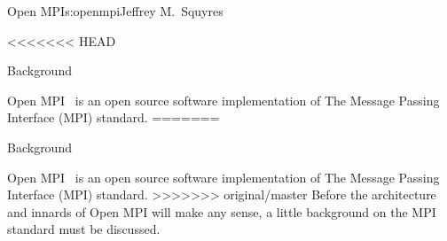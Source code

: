 \begin{aosachapter}{Open MPI}{s:openmpi}{Jeffrey M.\ Squyres}

<<<<<<< HEAD




\begin{aosasect1}{Background}


Open MPI~\cite{gabriel04:_open_mpi} is an open source software
implementation of The Message Passing Interface (MPI) standard.
%
=======
\begin{aosasect1}{Background}

Open MPI~\cite{bib:open-mpi-general} is an open source software
implementation of The Message Passing Interface (MPI) standard.
>>>>>>> original/master
Before the architecture and innards of Open MPI will make any sense,
a little background on the MPI standard must be discussed.


\end{aosasect1}
\end{aosasect1}
\end{aosachapter}
